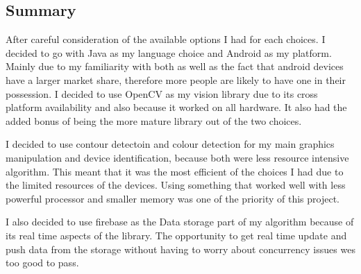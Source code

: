 \subsection{Summary}
After careful consideration of the available options I had for each choices. I decided to go with Java as my language choice and Android as my platform. Mainly due to my familiarity with both as well as the fact that android devices have a larger market share, therefore more people are likely to have one in their possession.  I decided to use OpenCV as my vision library due to its cross platform availability and also because it worked on all hardware. It also had the added bonus of being the more mature library out of the two choices.

I decided to use contour detectoin and colour detection for my main graphics manipulation and device identification, because both were less resource intensive algorithm. This meant that it was the most efficient of the choices I had due to the limited resources of the devices. Using something that worked well with less powerful processor and smaller memory was one of the priority of this project.

I also decided to use firebase as the Data storage part of my algorithm because of its real time aspects of the library. The opportunity to get real time update and push data from the storage without having to worry about concurrency issues wes too good to pass.